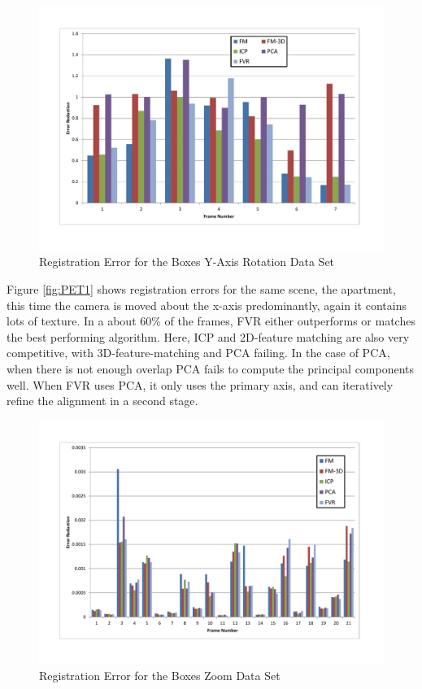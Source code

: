 \begin{figure}[t]
\centering
\includegraphics[width=6.0in]{images/results/Boxes_Texture_Rotate}
\caption{Registration Error for the Boxes Y-Axis Rotation Data Set}
\label{fig:PET2}
\end{figure}

Figure \ref{fig:PET1} shows registration errors for the same scene, the apartment, this time the camera is moved about the x-axis predominantly, again it contains lots of texture. In a about 60\% of the frames, FVR either outperforms or matches the best performing algorithm. Here, ICP and 2D-feature matching are also very competitive, with 3D-feature-matching and PCA failing. In the case of PCA, when there is not enough overlap PCA fails to compute the principal components well. When FVR uses PCA, it only uses the primary axis, and can iteratively refine the alignment in a second stage.

\begin{figure}[t]
\centering
\includegraphics[width=6.0in]{images/results/Boxes_Texture_ZoomOut}
\caption{Registration Error for the Boxes Zoom Data Set}
\label{fig:PET3}
\end{figure}

